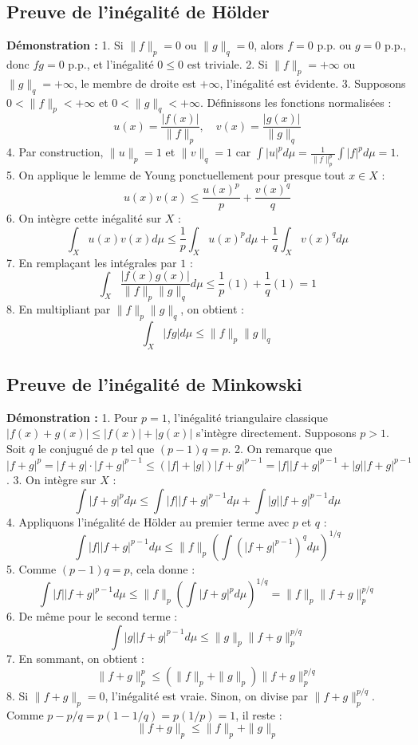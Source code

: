 \documentclass[11pt,a4paper]{article}
\begin{document}
\subsection*{Preuve de l'inégalité de Hölder}

\textbf{Démonstration :}
1. Si $\|f\|_p = 0$ ou $\|g\|_q = 0$, alors $f=0$ p.p. ou $g=0$ p.p., donc $fg=0$ p.p., et l'inégalité $0 \le 0$ est triviale.
2. Si $\|f\|_p = +\infty$ ou $\|g\|_q = +\infty$, le membre de droite est $+\infty$, l'inégalité est évidente.
3. Supposons $0 < \|f\|_p < +\infty$ et $0 < \|g\|_q < +\infty$. Définissons les fonctions normalisées :
   $$u(x) = \frac{|f(x)|}{\|f\|_p}, \quad v(x) = \frac{|g(x)|}{\|g\|_q}$$
4. Par construction, $\|u\|_p = 1$ et $\|v\|_q = 1$ car $\int |u|^p d\mu = \frac{1}{\|f\|_p^p} \int |f|^p d\mu = 1$.
5. On applique le lemme de Young ponctuellement pour presque tout $x \in X$ :
   $$u(x)v(x) \le \frac{u(x)^p}{p} + \frac{v(x)^q}{q}$$
6. On intègre cette inégalité sur $X$ :
   $$\int_X u(x)v(x) d\mu \le \frac{1}{p} \int_X u(x)^p d\mu + \frac{1}{q} \int_X v(x)^q d\mu$$
7. En remplaçant les intégrales par $1$ :
   $$\int_X \frac{|f(x)g(x)|}{\|f\|_p \|g\|_q} d\mu \le \frac{1}{p}(1) + \frac{1}{q}(1) = 1$$
8. En multipliant par $\|f\|_p \|g\|_q$, on obtient :
   $$\int_X |fg| d\mu \le \|f\|_p \|g\|_q$$

\subsection*{Preuve de l'inégalité de Minkowski}

\textbf{Démonstration :}
1. Pour $p=1$, l'inégalité triangulaire classique $|f(x)+g(x)| \le |f(x)| + |g(x)|$ s'intègre directement. Supposons $p > 1$. Soit $q$ le conjugué de $p$ tel que $(p-1)q = p$.
2. On remarque que $|f+g|^p = |f+g| \cdot |f+g|^{p-1} \le (|f| + |g|) |f+g|^{p-1} = |f||f+g|^{p-1} + |g||f+g|^{p-1}$.
3. On intègre sur $X$ :
   $$\int |f+g|^p d\mu \le \int |f| |f+g|^{p-1} d\mu + \int |g| |f+g|^{p-1} d\mu$$
4. Appliquons l'inégalité de Hölder au premier terme avec $p$ et $q$ :
   $$\int |f| |f+g|^{p-1} d\mu \le \|f\|_p \left( \int (|f+g|^{p-1})^q d\mu \right)^{1/q}$$
5. Comme $(p-1)q = p$, cela donne :
   $$\int |f| |f+g|^{p-1} d\mu \le \|f\|_p \left( \int |f+g|^p d\mu \right)^{1/q} = \|f\|_p \|f+g\|_p^{p/q}$$
6. De même pour le second terme :
   $$\int |g| |f+g|^{p-1} d\mu \le \|g\|_p \|f+g\|_p^{p/q}$$
7. En sommant, on obtient :
   $$\|f+g\|_p^p \le (\|f\|_p + \|g\|_p) \|f+g\|_p^{p/q}$$
8. Si $\|f+g\|_p = 0$, l'inégalité est vraie. Sinon, on divise par $\|f+g\|_p^{p/q}$. Comme $p - p/q = p(1 - 1/q) = p(1/p) = 1$, il reste :
   $$\|f+g\|_p \le \|f\|_p + \|g\|_p$$
\end{document}
